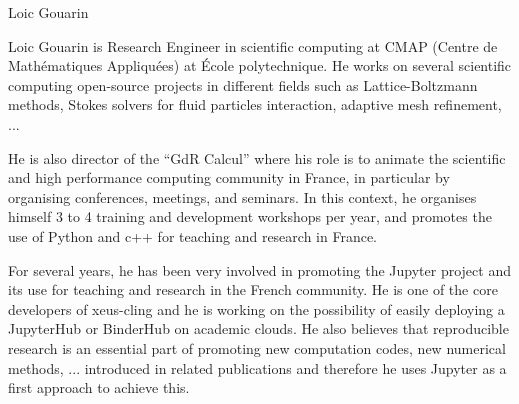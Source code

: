 \begin{participant}[type=R,PM=8,gender=male]{Loic Gouarin}

  Loic Gouarin is Research Engineer in scientific computing at CMAP (Centre de
  Mathématiques Appliquées) at \'Ecole polytechnique. He works on several
  scientific computing open-source projects in different fields such as
  Lattice-Boltzmann methods, Stokes solvers for fluid particles interaction,
  adaptive mesh refinement, ...

  He is also director of the ``GdR Calcul'' where his role is to animate the
  scientific and high performance computing community in France, in particular
  by organising conferences, meetings, and seminars. In this context, he
  organises himself 3 to 4 training and development workshops per year, and
  promotes the use of Python and c++ for teaching and research in France.
  
  For several years, he has been very involved in promoting the Jupyter project
  and its use for teaching and research in the French community. He is one of
  the core developers of xeus-cling and he is working on the possibility of
  easily deploying a JupyterHub or BinderHub on academic clouds. He also
  believes that reproducible research is an essential part of promoting new
  computation codes, new numerical methods, ... introduced in related
  publications and therefore he uses Jupyter as a first approach to achieve this.
  
  \end{participant}
  
  
